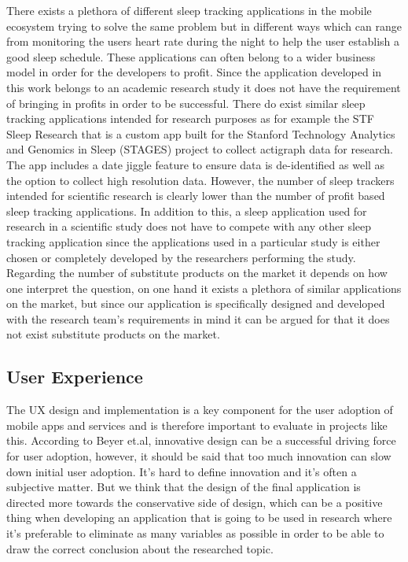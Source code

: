\documentclass{article}
\begin{document}
There exists a plethora of different sleep tracking applications in the mobile ecosystem trying to solve the same problem but in different ways which can range from monitoring the users heart rate during the night to help the user establish a good sleep schedule. These applications can often belong to a wider business model in order for the developers to profit. Since the application developed in this work belongs to an academic research study it does not have the requirement of bringing in profits in order to be successful. There do exist similar sleep tracking applications intended for research purposes as for example the STF Sleep Research that is a custom app built for the Stanford Technology Analytics and Genomics in Sleep (STAGES) project to collect actigraph data for research. The app includes a date jiggle feature to ensure data is de-identified as well as the option to collect high resolution data.\cite{gallichio_prometheus_2018} 
However, the number of sleep trackers intended for scientific research is clearly lower than the number of profit based sleep tracking applications. In addition to this, a sleep application used for research in a scientific study does not have to compete with any other sleep tracking application since the applications used in a particular study is either chosen or completely developed by the researchers performing the study. Regarding the number of substitute products on the market it depends on how one interpret the question, on one hand it exists a plethora of similar applications on the market, but since our application is specifically designed and developed with the research team’s requirements in mind it can be argued for that it does not exist substitute products on the market. 

\subsection{User Experience}

The UX design and implementation is a key component for the user adoption of mobile apps and services and is therefore important to evaluate in projects like this. According to Beyer et.al, innovative design can be a successful driving force for user adoption, however, it should be said that too much innovation can slow down initial user adoption.\cite{beyer_contextual_1998} It’s hard to define innovation and it’s often a subjective matter. But we think that the design of the final application is directed more towards the conservative side of design, which can be a positive thing when developing an application that is going to be used in research where it's preferable to eliminate as many variables as possible in order to be able to draw the correct conclusion about the researched topic.\cite{galitz_essential_2007}
\end{document}
